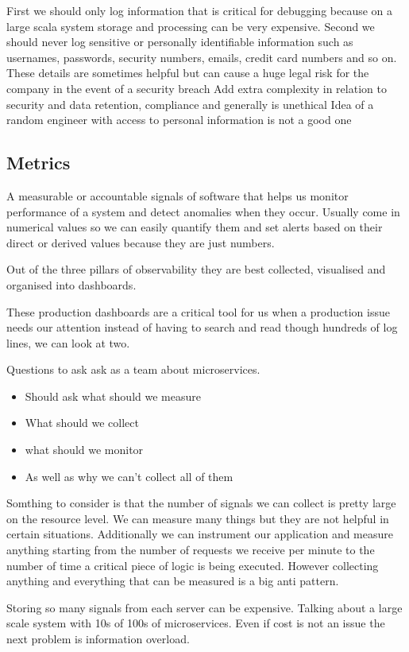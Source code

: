 First we should only log information that is critical for debugging because on a large scala system storage and processing can be very expensive.
Second we should never log sensitive or personally identifiable information such as usernames, passwords, security numbers, emails, credit card numbers and so on.
These details are sometimes helpful but can cause a huge legal risk for the company in the event of a security breach
Add extra complexity in relation to security and data retention, compliance and generally is unethical
Idea of a random engineer with access to personal information is not a good one

\subsection{Metrics}
A measurable or accountable signals of software that helps us monitor performance of a system and detect anomalies when they occur.
Usually come in numerical values so we can easily quantify them and set alerts based on their direct or derived values because they are just numbers.

Out of the three pillars of observability they are best collected, visualised and organised into dashboards.

These production dashboards are a critical tool for us when a production issue needs our attention instead of having to search and read though hundreds of log lines, we can look at two.

Questions to ask ask as a team about microservices.
\begin{itemize}
    \item Should ask what should we measure
    \item What should we collect
    \item what should we monitor
    \item As well as why we can't collect all of them
\end{itemize}

Somthing to consider is that the number of signals we can collect is pretty large on the resource level.
We can measure many things but they are not helpful in certain situations.
Additionally we can instrument our application and measure anything starting from the number of requests we receive per minute to the number of time a critical piece of logic is being executed.
However collecting anything and everything that can be measured is a big anti pattern.

Storing so many signals from each server can be expensive.
Talking about a large scale system with 10s of 100s of microservices.
Even if cost is not an issue the next problem is information overload.

